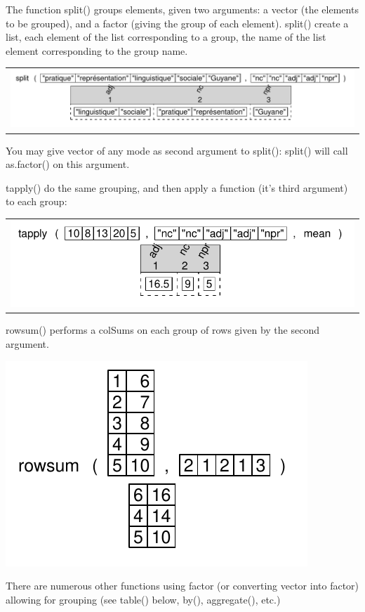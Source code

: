 \documentclass[pdflatex]{article}
\begin{document}
The function split() groups elements, given two arguments: a vector (the
elements to be grouped), and a factor (giving the group of each element).
split() create a list, each element of the list corresponding to a group, the
name of the list element corresponding to the group name.

\begin{tabular}{c}
\includegraphics{split2}
\end{tabular}

You may give vector of any mode as second argument to split(): split() will
call as.factor() on this argument.

tapply() do the same grouping, and then apply a function (it's third argument)
to each group:

\begin{tabular}{c}
\includegraphics{tapply}
\end{tabular}

rowsum() performs a colSums on each group of rows given by the second argument.

\includegraphics{rowsum} 

There are numerous other functions using factor (or converting vector into
factor) allowing for grouping (see table() below, by(), aggregate(), etc.)
\end{document}
